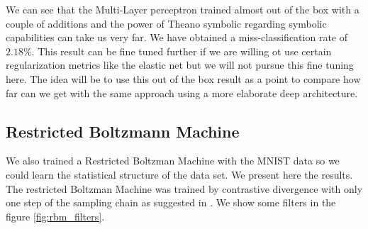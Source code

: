 \documentclass[11pt,a4paper]{article}
\begin{document}
We can see that the Multi-Layer perceptron trained almost out of the box with a couple of additions and the power of Theano symbolic regarding symbolic capabilities can take us very far. We have obtained a miss-classification rate of $2.18 \%$.  This result can be fine tuned further if we are willing ot use certain regularization metrics like the elastic net \citep{zou2005regularization} but we will not pursue this fine tuning here. The idea will be to use this out of the box result as a point to compare how far can we get with the same approach using a more elaborate deep architecture. 



\subsection{Restricted Boltzmann Machine}

We also trained a Restricted Boltzman Machine with the MNIST data so we could learn the statistical structure of the data set. We present here the results. The restricted Boltzman Machine was trained by contrastive divergence with only one step of the sampling chain as suggested in \citep{fischer2014training}. We show some filters in the figure \ref{fig:rbm_filters}.
\end{document}
